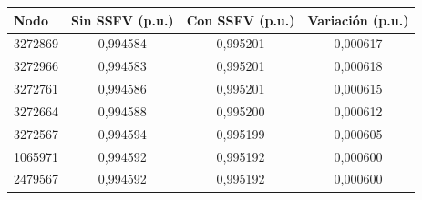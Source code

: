 \begin{tabular}{lccc}
\toprule
\textbf{Nodo} & \textbf{Sin SSFV (p.u.)} & \textbf{Con SSFV (p.u.)} & \textbf{Variación (p.u.)} \\
\midrule
3272869 & 0,994584 & 0,995201 & 0,000617 \\
3272966 & 0,994583 & 0,995201 & 0,000618 \\
3272761 & 0,994586 & 0,995201 & 0,000615 \\
3272664 & 0,994588 & 0,995200 & 0,000612 \\
3272567 & 0,994594 & 0,995199 & 0,000605 \\
1065971 & 0,994592 & 0,995192 & 0,000600 \\
2479567 & 0,994592 & 0,995192 & 0,000600 \\
\bottomrule
\end{tabular}
